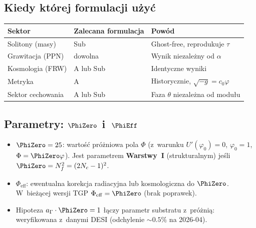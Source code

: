 \subsection{Kiedy której formulacji użyć}

\begin{center}\small
\begin{tabular}{@{}lll@{}}
\toprule
\textbf{Sektor} & \textbf{Zalecana formulacja} & \textbf{Powód} \\
\midrule
Solitony (masy) & Sub & Ghost-free, reprodukuje $\tau$ \\
Grawitacja (PPN) & dowolna & Wynik niezależny od $\alpha$ \\
Kosmologia (FRW) & A lub Sub & Identyczne wyniki \\
Metryka & A & Historycznie, $\sqrt{-g} = c_0\varphi$ \\
Sektor cechowania & A lub Sub & Faza $\theta$ niezależna od modułu \\
\bottomrule
\end{tabular}
\end{center}

\subsection{Parametry: $\PhiZero$ i~$\PhiEff$}

\begin{remark}
\begin{itemize}[nosep]
  \item $\PhiZero = 25$: wartość próżniowa pola $\Phi$
    (z~warunku $U'(\varphi_0) = 0$, $\varphi_0 = 1$,
    $\Phi = \PhiZero\varphi$). Jest parametrem \textbf{Warstwy~I}
    (strukturalnym) jeśli $\PhiZero = N_f^2 = (2N_c - 1)^2$.
  \item $\Phi_{\mathrm{eff}}$: ewentualna korekcja radiacyjna
    lub kosmologiczna do $\PhiZero$. W~bieżącej wersji TGP
    $\Phi_{\mathrm{eff}} = \PhiZero$ (brak poprawek).
  \item Hipoteza $a_\Gamma \cdot \PhiZero = 1$ łączy parametr
    substratu z~próżnią: weryfikowana z~danymi DESI
    (odchylenie $\sim 0.5\%$ na 2026-04).
\end{itemize}
\end{remark}

